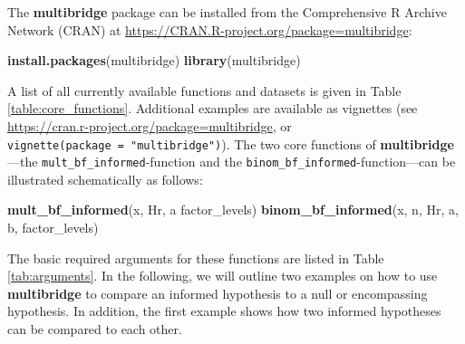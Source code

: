 \documentclass[
  english,
  man,floatsintext]{apa6}
\newenvironment{Shaded}{\begin{snugshade}}{\end{snugshade}}
\newcommand{\KeywordTok}[1]{\textcolor[rgb]{0.13,0.29,0.53}{\textbf{#1}}}
\newcommand{\NormalTok}[1]{#1}
\newcommand{\StringTok}[1]{\textcolor[rgb]{0.31,0.60,0.02}{#1}}
\begin{document}
The \textbf{multibridge} package can be installed from the Comprehensive R Archive Network (CRAN) at
\url{https://CRAN.R-project.org/package=multibridge}:

\begin{Shaded}
\begin{Highlighting}[]
\KeywordTok{install.packages}\NormalTok{(}\StringTok{\textquotesingle{}multibridge\textquotesingle{}}\NormalTok{)}
\KeywordTok{library}\NormalTok{(}\StringTok{\textquotesingle{}multibridge\textquotesingle{}}\NormalTok{)}
\end{Highlighting}
\end{Shaded}

A list of all currently available functions and datasets is given in Table \ref{table:core_functions}. Additional examples are available as vignettes (see \url{https://cran.r-project.org/package=multibridge}, or \texttt{vignette(package\ =\ "multibridge")}). The two core functions of \textbf{multibridge}---the \texttt{mult\_bf\_informed}-function and the \texttt{binom\_bf\_informed}-function---can be illustrated schematically as follows:

\begin{Shaded}
\begin{Highlighting}[]
\KeywordTok{mult\_bf\_informed}\NormalTok{(x, Hr, a factor\_levels)}
\KeywordTok{binom\_bf\_informed}\NormalTok{(x, n, Hr, a, b, factor\_levels)}
\end{Highlighting}
\end{Shaded}

The basic required arguments for these functions are listed in Table \ref{tab:arguments}. In the following, we will outline two examples on how to use \textbf{multibridge} to compare an informed hypothesis to a null or encompassing hypothesis. In addition, the first example shows how two informed hypotheses can be compared to each other.
\end{document}
